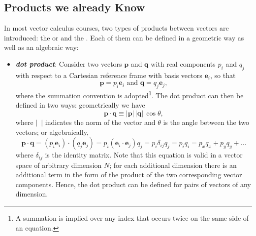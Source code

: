 \subsection{Products we already Know}
In most vector calculus courses, two types of products between vectors are introduced: the  or  and the .  Each of them can be defined in a geometric way as well as an algebraic way:
\begin{itemize}
	\item \textbf{\textit{dot product}}: Consider two vectors $\mathbf{p}$ and $\mathbf{q}$ with real components $p_i$ and $q_j$ with respect to a Cartesian reference frame with basis vectors $\mathbf{e}_i$, so that
	\[
		\mathbf{p} = p_i\mathbf{e}_i\text{ and }\mathbf{q}=q_j\mathbf{e}_j,
	\]
	where the summation convention is adopted\footnote{A summation is implied over any index that occurs twice on the same side of an equation.}. The dot product can then be defined in two ways: geometrically we have
	\begin{equation}
		\mathbf{p}\cdot\mathbf{q} \equiv \vert\mathbf{p}\vert\,\vert\mathbf{q}\vert\,\cos\theta,
	\end{equation}
	where $\vert\,\,\,\vert$ indicates the norm of the vector and $\theta$ is the angle between the two vectors; or algebraically,
	\begin{equation}
		\mathbf{p}\cdot\mathbf{q} = (p_i\mathbf{e}_i)\cdot(q_j\mathbf{e}_j) = p_i (\mathbf{e}_i\cdot\mathbf{e}_j)q_j = p_i\delta_{ij}q_j=p_iq_i=p_xq_x+p_yq_y+\ldots
	\end{equation}
	where $\delta_{ij}$ is the identity matrix.  Note that this equation is valid in a vector space of arbitrary dimension $N$; for each additional dimension there is an additional term in the form of the product of the two corresponding vector components.  Hence, the dot product can be defined for pairs of vectors of any dimension.


\end{itemize}
